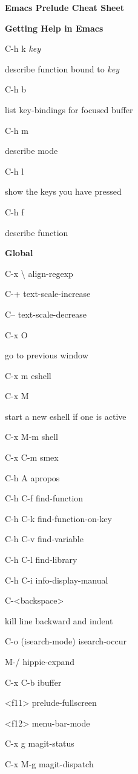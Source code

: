 \documentclass[10pt]{article}
\renewcommand\section[1]{\bigskip\par\textbf{\color{heading}\large#1}\smallskip}
\newcommand\humanreadable[1]{{\par\color{default}\small\sffamily#1}}
\newcommand\meta[1]{\textlangle\textit{#1}\textrangle}
\begin{document}
\begin{multicols}{4}

  \setlength{\columnsep}{1cm}
  \begin{center}
    \LARGE\color{heading}\textbf{Emacs Prelude Cheat Sheet}
  \end{center}

  \section{Getting Help in Emacs}
  \begin{keylist}
  \item[C-h k \meta{key}] \humanreadable{describe function bound to \meta{key}}
  \item[C-h b] \humanreadable{list key-bindings for focused buffer}
  \item[C-h m] \humanreadable{describe mode}
  \item[C-h l] \humanreadable{show the keys you have pressed}
  \item[C-h f] \humanreadable{describe function}
  \end{keylist}

  \section{Global}
  \begin{keylist}
  \item[C-x \textbackslash] align-regexp
  \item[C-+] text-scale-increase
  \item[C--] text-scale-decrease
  \item[C-x O] \humanreadable{go to previous window}
  \item[C-x m] eshell
  \item[C-x M] \humanreadable{start a new eshell if one is active}
  \item[C-x M-m] shell
  \item[C-x C-m] smex
  \item[C-h A] apropos
  \item[C-h C-f] find-function
  \item[C-h C-k] find-function-on-key
  \item[C-h C-v] find-variable
  \item[C-h C-l] find-library
  \item[C-h C-i] info-display-manual
  \item[C-<backspace>] \humanreadable{kill line backward and indent}
  \item[C-o] (isearch-mode) isearch-occur
  \item[M-/] hippie-expand
  \item[C-x C-b] ibuffer
  \item[<f11>] prelude-fullscreen
  \item[<f12>] menu-bar-mode
  \item[C-x g] magit-status
  \item[C-x M-g] magit-dispatch
  \end{keylist}


\end{multicols}
\end{document}
